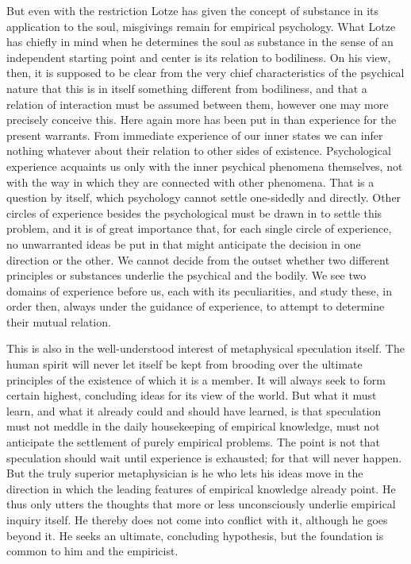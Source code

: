 \documentclass[12pt,a4paper]{book}
\newcommand{\opage}[1]{\marginnote{\footnotesize\textit{[#1]}}}
\begin{document}
But even with the restriction Lotze has given the concept of substance
in its application to the soul, misgivings remain for empirical
psychology. What Lotze has chiefly in mind when he determines the soul
as substance in the sense of an independent starting point and center is
its relation to bodiliness. On his view, then, it is supposed to be
clear from the very chief characteristics of the psychical nature that
this is in itself something different from bodiliness, and that a
relation of interaction must be assumed between them, however one may
more precisely conceive this. Here again more has been put in than
experience for the present warrants. From immediate experience of our
inner states we can infer nothing whatever about their relation to other
sides of existence. Psychological experience acquaints us only with the
inner psychical phenomena themselves,
\opage{16}not with the way in which they are connected with other
phenomena. That is a question by itself, which psychology cannot settle
one-sidedly and directly. Other circles of experience besides the
psychological must be drawn in to settle this problem, and it is of
great importance that, for each single circle of experience, no
unwarranted ideas be put in that might anticipate the decision in one
direction or the other. We cannot decide from the outset whether two
different principles or substances underlie the psychical and the
bodily. We see two domains of experience before us, each with its
peculiarities, and study these, in order then, always under the guidance
of experience, to attempt to determine their mutual relation.

This is also in the well-understood interest of metaphysical speculation
itself. The human spirit will never let itself be kept from brooding
over the ultimate principles of the existence of which it is a member.
It will always seek to form certain highest, concluding ideas for its
view of the world. But what it must learn, and what it already could and
should have learned, is that speculation must not meddle in the daily
housekeeping of empirical knowledge, must not anticipate the settlement
of purely empirical problems. The point is not that speculation should
wait until experience is exhausted; for that will never happen. But the
truly superior metaphysician is he who lets his ideas move in the
direction in which the leading features of empirical knowledge already
point. He thus only utters the thoughts that more or less unconsciously
underlie empirical inquiry itself. He thereby does not come into
conflict with it, although he goes beyond it. He seeks an ultimate,
concluding hypothesis, but the foundation is common to him and the
empiricist.
\end{document}
